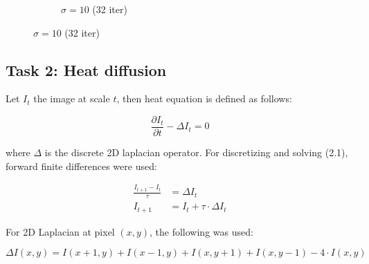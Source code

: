 \documentclass[paper=a4, fontsize=11pt]{scrartcl} %
\numberwithin{equation}{section} %
\numberwithin{figure}{section} %
\numberwithin{table}{section} %
\begin{document}
\begin{figure}[b]
\begin{subfigure}[b]{0.3\textwidth}
		\noindent{}
	\caption{$\sigma = 10$ (32 iter)}
	\end{subfigure}
\end{figure}



\subsection{Task 2: Heat diffusion}

Let $I_t$ the image at scale $t$, then heat equation is defined as follows:

\begin{equation}
	\frac{\partial I_t}{\partial t} - \Delta I_t = 0
\end{equation}

where $\Delta$ is the discrete 2D laplacian operator. For discretizing and solving (2.1), forward finite differences were used:

\begin{align}
	\frac{I_{t+1} - I_t}{\tau} &= \Delta I_t \\
	I_{t+1} &= I_t + \tau \cdot \Delta I_t
\end{align}

For 2D Laplacian at pixel $(x, y)$, the following was used:

\begin{equation}
	\Delta I(x, y) = I(x+1, y) + I(x-1, y) + I(x, y+1) + I(x, y - 1) - 4 \cdot I(x, y)
\end{equation}
\end{document}
